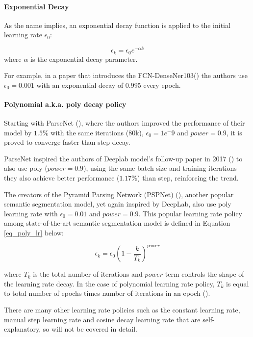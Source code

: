 \paragraph{Exponential Decay} 
As the name implies, an exponential decay function is applied to the initial learning rate $\epsilon_0$:

\begin{equation} \label{eq_exp_lr}
\epsilon_k = \epsilon_0e^{-\alpha k}
\end{equation} 
where $\alpha$ is the exponential decay parameter.

For example, in a paper that introduces the \gls{FCN}-DenseNer103(\cite{Jegou_2017_CVPR_Workshops}) the authors use $\epsilon_0=0.001$ with an exponential decay of $0.995$ every epoch.
\paragraph{Polynomial \gls{a.k.a.} poly decay policy} 

Starting with ParseNet (\cite{liu2015parsenet}), where the authors improved the performance of their model by $1.5\%$ with the same iterations (80k), $\epsilon_0= 1e^-9 $ and $power=0.9$, it is proved to converge faster than step decay. 

ParseNet inspired the authors of Deeplab model's follow-up paper in 2017 (\cite{chen2017deeplab}) to also use poly ($power=0.9$), using the same batch size and training iterations they also achieve better performance ($1.17\%$) than step, reinforcing the trend. 

The creators of the Pyramid Parsing Network (PSPNet) (\cite{zhao2017pyramid}), another popular semantic segmentation model, yet again inspired by DeepLab, also use poly learning rate with $\epsilon_0= 0.01$ and $power=0.9$. This popular learning rate policy among state-of-the-art semantic segmentation model is defined in Equation \ref{eq_poly_lr} below:

\begin{equation} \label{eq_poly_lr}
\epsilon_k=\epsilon_0(1- \frac{k}{T_{k}})^{power} 
\end{equation}

where $T_{k}$ is the total number of iterations and $power$ term controls the shape of the learning rate decay. In the case of polynomial learning rate policy, $T_{k}$ is equal to total number of epochs times number of iterations in an epoch (\cite{8929465}).

There are many other learning rate policies such as the constant learning rate, manual step learning rate and cosine decay learning rate that are self-explanatory, so will not be covered in detail.
